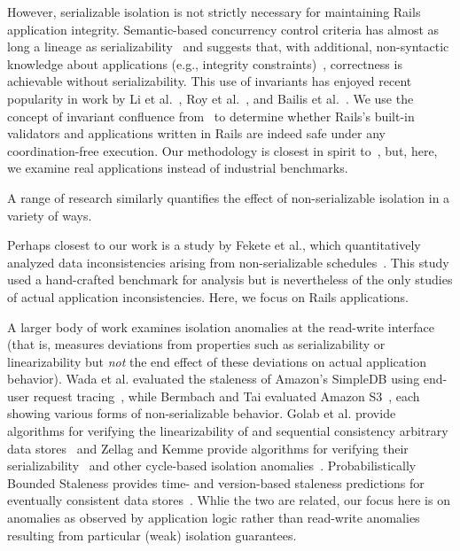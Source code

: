 However, serializable isolation is not strictly necessary for
maintaining Rails application integrity. Semantic-based concurrency
control criteria has almost as long a lineage as
serializability~\cite{eswaran-consistency,ic-survey-two} and suggests
that, with additional, non-syntactic knowledge about applications
(e.g., integrity constraints)~\cite{kung1979optimality}, correctness
is achievable without serializability. This use of invariants has
enjoyed recent popularity in work by Li et al.~\cite{redblue-new}, Roy
et al.~\cite{writes-forest}, and Bailis et al.~\cite{coord-avoid}. We
use the concept of invariant confluence from~\cite{coord-avoid} to
determine whether Rails's built-in validators and applications written
in Rails are indeed safe under any coordination-free execution. Our
methodology is closest in spirit to~\cite{coord-avoid}, but, here, we
examine real applications instead of industrial benchmarks.

 A range of research similarly
quantifies the effect of non-serializable isolation in a variety of
ways.

Perhaps closest to our work is a study by Fekete et al., which
quantitatively analyzed data inconsistencies arising from
non-serializable schedules~\cite{fekete-quantifying}. This study used
a hand-crafted benchmark for analysis but is nevertheless of the only
studies of actual application inconsistencies. Here, we focus on Rails
applications.

A larger body of work examines isolation anomalies at the read-write
interface (that is, measures deviations from properties such as
serializability or linearizability but \textit{not} the end effect of
these deviations on actual application behavior). Wada et
al. evaluated the staleness of Amazon's SimpleDB using end-user
request tracing~\cite{wada-data}, while Bermbach and Tai evaluated
Amazon S3~\cite{bermbach-eventual}, each showing various forms of
non-serializable behavior. Golab et al. provide algorithms for
verifying the linearizability of and sequential consistency arbitrary
data stores~\cite{golab-analyzing} and Zellag and Kemme provide
algorithms for verifying their
serializability~\cite{zellag-consistent} and other cycle-based
isolation anomalies~\cite{zellag-real}. Probabilistically Bounded
Staleness provides time- and version-based staleness predictions for
eventually consistent data stores~\cite{pbs}. Whlie the two are
related, our focus here is on anomalies as observed by application
logic rather than read-write anomalies resulting from particular
(weak) isolation guarantees.


